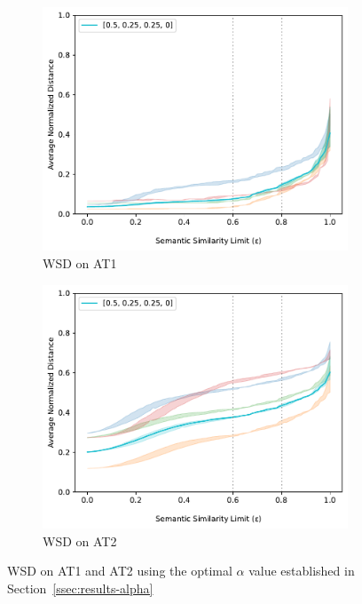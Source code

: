 \newcommand{\WSDWidth}{.45\linewidth}
\begin{figure}[t]
    \centering
    \begin{subfigure}[b]{\WSDWidth}
        \includegraphics[width=\linewidth]{code/img/wsd-at1.pdf}
        \caption{WSD on AT1}
        \label{fig:wsd-at1}
    \end{subfigure}
    \begin{subfigure}[b]{\WSDWidth}
        \includegraphics[width=\linewidth]{code/img/wsd-at2.pdf}
        \caption{WSD on AT2}
        \label{fig:wsd-at2}
    \end{subfigure}
    \caption{WSD on AT1 and AT2 using the optimal $\alpha$ value established in Section~\ref{ssec:results-alpha}}
    \label{fig:wsd}
\end{figure}

